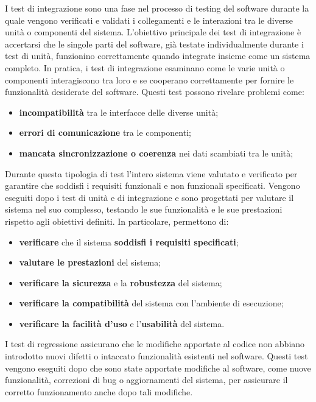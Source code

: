 I test di integrazione sono una fase nel processo di testing del software durante la quale vengono verificati e validati i collegamenti e le interazioni tra le diverse unità o componenti del sistema. L'obiettivo principale dei test di integrazione è accertarsi che le singole parti del software, già testate individualmente durante i test di unità, funzionino correttamente quando integrate insieme come un sistema completo. In pratica, i test di integrazione esaminano come le varie unità o componenti interagiscono tra loro e se cooperano correttamente per fornire le funzionalità desiderate del software. Questi test possono rivelare problemi come:
\begin{itemize}
	\item \textbf{incompatibilità} tra le interfacce delle diverse unità;
	\item \textbf{errori di comunicazione} tra le componenti;
	\item \textbf{mancata sincronizzazione o coerenza} nei dati scambiati tra le unità;
\end{itemize}

Durante questa tipologia di test l'intero sistema viene valutato e verificato per garantire che soddisfi i requisiti funzionali e non funzionali specificati. Vengono eseguiti dopo i test di unità e di integrazione e sono progettati per valutare il sistema nel suo complesso, testando le sue funzionalità e le sue prestazioni rispetto agli obiettivi definiti. In particolare, permettono di:
\begin{itemize}
	\item \textbf{verificare} che il sistema \textbf{soddisfi i requisiti specificati};
	\item \textbf{valutare le prestazioni} del sistema;
	\item \textbf{verificare la sicurezza} e la \textbf{robustezza} del sistema;
	\item \textbf{verificare la compatibilità} del sistema con l'ambiente di esecuzione;
	\item \textbf{verificare la facilità d'uso} e l'\textbf{usabilità} del sistema.
\end{itemize}

I test di regressione assicurano che le modifiche apportate al codice non abbiano introdotto nuovi difetti o intaccato funzionalità esistenti nel software. Questi test vengono eseguiti dopo che sono state apportate modifiche al software, come nuove funzionalità, correzioni di bug o aggiornamenti del sistema, per assicurare il corretto funzionamento anche dopo tali modifiche.

